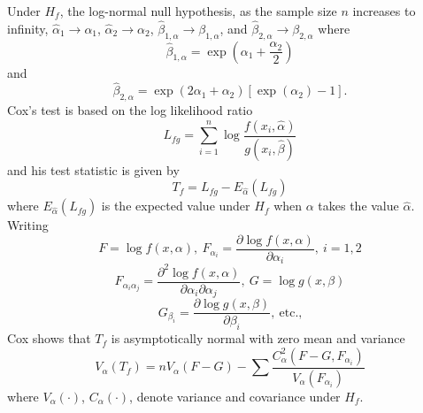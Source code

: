 \documentclass[draft]{article}
\begin{document}
Under \(H_f\), the log-normal null hypothesis, as the sample
size \(n\) increases to infinity,
\(\hat{\alpha}_1\rightarrow\alpha_1\),
\(\hat{\alpha}_2\rightarrow\alpha_2\),
\(\hat{\beta}_{1,\alpha}\rightarrow\beta_{1,\alpha}\),
and
\(\hat{\beta}_{2,\alpha}\rightarrow\beta_{2,\alpha}\)
where 
\begin{equation}
\hat{\beta}_{1,\alpha}=\exp\left(\alpha_1+\frac{\alpha_2}{2}\right)
\end{equation}
and
\begin{equation}
\hat{\beta}_{2,\alpha}=\exp
\left(2\alpha_1+\alpha_2\right)
\left[\exp\left(\alpha_2\right) -1\right].
\end{equation}
Cox's test is based on the log likelihood ratio
\begin{equation}
L_{fg}=\sum_{i=1}^n\log
\frac{f\left(x_i,\hat{\alpha}\right)}
     {g\left(x_i,\hat{\beta}\right)}
\end{equation}
and his test statistic is given by
\begin{equation}
T_f=L_{fg}-E_{\hat{\alpha}}\left(L_{fg}\right)
\end{equation}
where \(E_{\hat{\alpha}}\left(L_{fg}\right)\) is the expected
value under \(H_f\) when \(\alpha\) takes the value
\(\hat\alpha\). Writing
\begin{equation}
F=\log f\left(x,\alpha\right), \: 
F_{\alpha_i} = \frac{\partial\log f\left(x,\alpha\right)}{\partial\alpha_i},\:
i=1,2
\end{equation}
\null\begin{equation}
F_{\alpha_i\alpha_j} = \frac{\partial^2\log f\left(x,\alpha\right)}
{\partial\alpha_i\partial\alpha_j}, \:
G = \log g\left(x,\beta\right)
\end{equation}
\null\begin{equation}
G_{\beta_i}=\frac{\partial\log g\left(x,\beta\right)}{\partial\beta_i}, \:
\mbox{etc.,}
\end{equation}
Cox shows that \(T_f\) is asymptotically normal with zero mean and
variance
\begin{equation}
V_\alpha\left(T_f\right)=
nV_\alpha\left(F-G\right) -
\sum\frac{C_\alpha^2\left(F-G, F_{\alpha_i}\right)}
         {V_\alpha\left(F_{\alpha_i}\right)}
\end{equation}
where \(V_\alpha\left(\cdot\right)\),
\(C_\alpha\left(\cdot\right)\), denote variance and covariance under \(H_f\).
\end{document}

